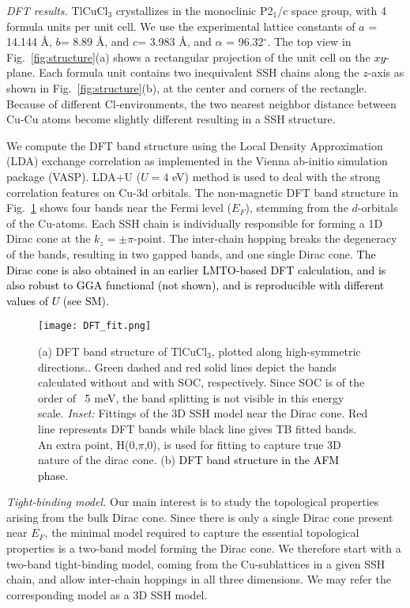 \documentclass[aps,prl,showpacs,twocolumn,groupedaddress]{revtex4-1}
\newcommand{\blue}{\textcolor{black}}
\begin{document}
{\it DFT results.} TlCuCl$_3$ crystallizes in the monoclinic P2$_1$/c space group, with 4 formula units per unit cell. We use the experimental lattice constants of $a$ = 14.144 \AA, $b$= 8.89 \AA, and $c$= 3.983 \AA , and $\alpha$ = 96.32$^\circ$. The top view in Fig.~\ref{fig:structure}(a) shows a rectangular projection of the unit cell on the \blue{$xy$}- plane. Each formula unit contains two inequivalent SSH chains along the \blue{$z$}-axis as shown in Fig.~\ref{fig:structure}(b), at the center and corners of the rectangle. Because of different Cl-environments, the two nearest neighbor distance between Cu-Cu atoms become slightly different resulting in a SSH structure. %

We compute the DFT band structure using the Local Density Approximation (LDA) exchange correlation as implemented in the Vienna  ab-initio simulation  package  (VASP)\cite{DFT1,DFT2}. LDA+U ($U=4$ eV) method is used to deal with the strong correlation features on Cu-3d orbitals. The non-magnetic DFT band structure in Fig.~\ref{fig:DFT} shows four bands near the Fermi level ($E_F$), stemming from the $d$-orbitals of the Cu-atoms. Each SSH chain is individually responsible for forming a 1D Dirac cone at the $k_z=\pm\pi$-point. The inter-chain hopping breaks the degeneracy of the bands, resulting in two gapped bands, and one single Dirac cone. \blue{The Dirac cone is also obtained in an earlier LMTO-based DFT calculation\cite{LMTODFT}, and is also robust to GGA functional (not shown), and is reproducible with different values of $U$ (see SM\cite{SM}).}

\begin{figure}[h]
	\texttt{[image: DFT\_fit.png]}
	\caption{(a) DFT band structure of TlCuCl$_3$, plotted along high-symmetric directions.\cite{footHSDir}. Green dashed and red solid lines depict the bands calculated without and with SOC, respectively. Since SOC is of the order of ~5 meV, the band splitting is not visible in this energy scale. {\it Inset:} Fittings of the 3D SSH model near the Dirac cone. Red line represents DFT bands while black line gives TB fitted bands. An extra point, H(0,$\pi$,0), is used for fitting to capture true 3D nature of the dirac cone. (b) \blue{DFT band structure in the AFM phase}.}
\label{fig:DFT}
\end{figure}

{\it Tight-binding model.} Our main interest is to study the topological properties arising from the bulk Dirac cone. Since there is only a single Dirac cone present near $E_F$, the minimal model required to capture the essential topological properties is a two-band model forming the Dirac cone. We therefore start with a two-band tight-binding model, coming from the Cu-sublattices in a given SSH chain, and allow inter-chain hoppings in all three dimensions. We may refer the corresponding model as a 3D SSH model. 
\end{document}
